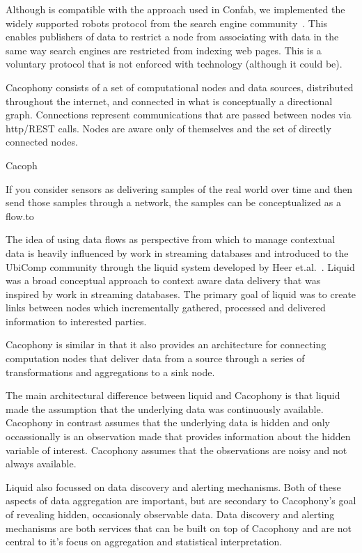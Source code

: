 Although \Cacophony is compatible with
the approach used in Confab, we implemented the widely supported robots protocol from the search
engine community~\cite{robotstxt}.  This enables publishers of data to restrict
a \Cacophony node from associating with data in the same way search engines
are restricted from indexing web pages.  This is a voluntary protocol that is
not enforced with technology (although it could be).




Cacophony consists of a set of computational nodes and data sources, distributed throughout the
internet, and connected in what is conceptually a directional graph.  Connections
represent communications that are passed between nodes via http/REST calls. Nodes are
aware only of themselves and the set of directly connected nodes.







Cacoph

If you consider sensors as delivering samples of the real world over time and
then send those samples through a network, the samples can be conceptualized as
a flow.to 


The idea of using data flows as perspective from which to manage contextual data
is heavily influenced by work in streaming databases and introduced to the
UbiComp community through the liquid system developed by Heer
et.al.~\cite{HeerNBH03}.  Liquid was a broad conceptual approach to context
aware data delivery that was inspired by work in streaming databases.  The
primary goal of liquid was to create links between nodes which incrementally
gathered, processed and delivered information to interested parties.

Cacophony is similar in that it also provides an architecture for connecting
computation nodes that deliver data from a source through a series of
transformations and aggregations to a sink node.

The main architectural difference between liquid and Cacophony is that liquid
made the assumption that the underlying data was continuously available.
Cacophony in contrast assumes that the underlying data is hidden and only
occassionally is an observation made that provides information about the hidden
variable of interest.  Cacophony assumes that the observations are noisy and not
always available.

Liquid also focussed on data discovery and alerting mechanisms.  Both of these
aspects of data aggregation are important, but are secondary to Cacophony's goal
of revealing hidden, occasionaly observable data.  Data discovery and alerting
mechanisms are both services that can be built on top of Cacophony and are not
central to it's focus on aggregation and statistical interpretation. 

